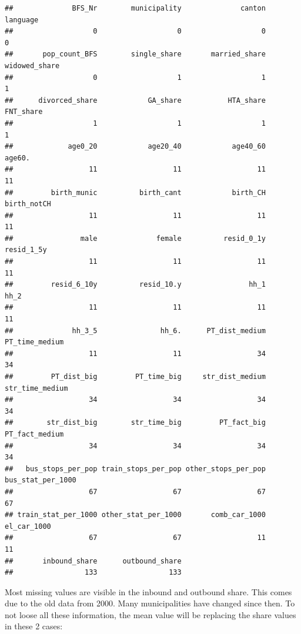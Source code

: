 \documentclass[
]{article}
\begin{document}
\begin{verbatim}
##              BFS_Nr        municipality              canton            language 
##                   0                   0                   0                   0 
##       pop_count_BFS        single_share       married_share       widowed_share 
##                   0                   1                   1                   1 
##      divorced_share            GA_share           HTA_share           FNT_share 
##                   1                   1                   1                   1 
##             age0_20            age20_40            age40_60              age60. 
##                  11                  11                  11                  11 
##         birth_munic          birth_cant            birth_CH         birth_notCH 
##                  11                  11                  11                  11 
##                male              female          resid_0_1y          resid_1_5y 
##                  11                  11                  11                  11 
##         resid_6_10y          resid_10.y                hh_1                hh_2 
##                  11                  11                  11                  11 
##              hh_3_5               hh_6.      PT_dist_medium      PT_time_medium 
##                  11                  11                  34                  34 
##         PT_dist_big         PT_time_big     str_dist_medium     str_time_medium 
##                  34                  34                  34                  34 
##        str_dist_big        str_time_big         PT_fact_big      PT_fact_medium 
##                  34                  34                  34                  34 
##   bus_stops_per_pop train_stops_per_pop other_stops_per_pop   bus_stat_per_1000 
##                  67                  67                  67                  67 
## train_stat_per_1000 other_stat_per_1000       comb_car_1000         el_car_1000 
##                  67                  67                  11                  11 
##       inbound_share      outbound_share 
##                 133                 133
\end{verbatim}

Most missing values are visible in the inbound and outbound share. This
comes due to the old data from 2000. Many municipalities have changed
since then. To not loose all these information, the mean value will be
replacing the share values in these 2 cases:
\end{document}
